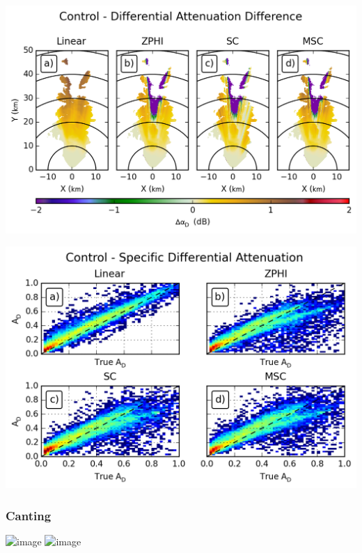 \documentclass[red]{beamer}
\begin{document}
\begin{frame}
    \begin{center}
        \includegraphics[scale=0.7]{figures/X_Control_Differential_Attenuation_Difference}
    \end{center}
\end{frame}

\begin{frame}
    \begin{center}
        \includegraphics[scale=0.7]{figures/X_Control_Specific_Differential_Attenuation_scatter}
    \end{center}
\end{frame}

\subsubsection{Canting}
\begin{frame}
    \begin{center}
        \includegraphics<1>[scale=0.7]{figures/C_Canting_Attenuation_H}
        \includegraphics<2>[scale=0.7]{figures/C_Control_Attenuation_H}
    \end{center}
\end{frame}
\end{document}
